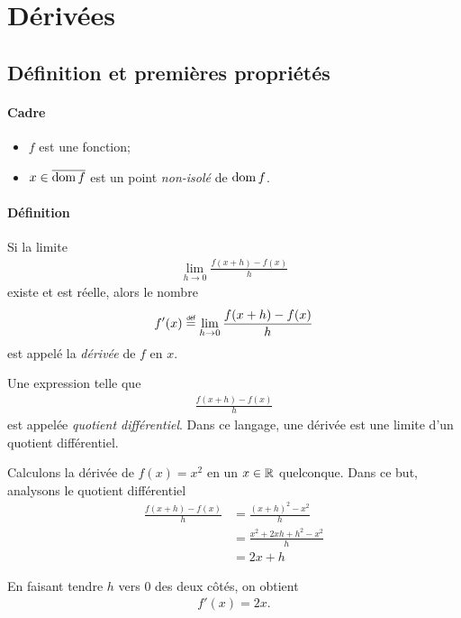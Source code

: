 \documentclass[main.tex]{subfiles}
\begin{document}
\tableofcontents

\chapter{Dérivées}

\section{Définition et premières propriétés}

\begin{definition}
    [Dérivée]

    \subsubsection*{Cadre}

    \begin{itemize}
        \item $f$ est une fonction;
        \item $x \in \overline{\operatorname{dom} f}$ est un point \emph{non-isol\'e} de $\operatorname{dom} f$.
    \end{itemize}

    \subsubsection*{Définition}

    Si la limite
    \begin{align}
        \lim_{h \to 0} \frac {f(x + h) - f(x)} h
    \end{align}
    existe et est réelle,
    alors le nombre
    \begin{align}
        f'(x) \defeq \lim_{h \to 0} \frac {f(x + h) - f(x)} h
    \end{align}
    est appelé la \emph{dérivée} de $f$ en $x$.
\end{definition}

\begin{remark}
    Une expression telle que
    \begin{align}
        \frac {f(x + h) - f(x)} h
    \end{align}
    est appelée \emph{quotient différentiel}.
    Dans ce langage,
    une dérivée est une limite d'un quotient différentiel.
\end{remark}

\begin{example}
    [Dérivée de $x^2$]

    Calculons la dérivée de $f(x) = x^2$ en un $x \in \mathbb{R}$ quelconque.
    Dans ce but,
    analysons le quotient différentiel
    \begin{align}
        \frac {f(x + h) - f(x)} h
        &= \frac {{(x + h)}^2 - x^2} h\\
        &= \frac {x^2 + 2xh + h^2 - x^2} h\\
        &= 2x + h
    \end{align}

    En faisant tendre $h$ vers $0$ des deux côtés,
    on obtient
    \begin{align}
        f'(x) = 2x.
    \end{align}
\end{example}
\end{document}
